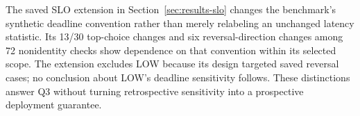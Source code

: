 The saved SLO extension in Section~\ref{sec:results-slo} changes the
benchmark's synthetic deadline convention rather than merely relabeling
an unchanged latency statistic. Its 13/30 top-choice changes and six
reversal-direction changes among 72 nonidentity checks show dependence on
that convention within its selected scope. The extension excludes LOW
because its design targeted saved reversal cases; no conclusion about
LOW's deadline sensitivity follows. These distinctions answer Q3 without
turning retrospective sensitivity into a prospective deployment guarantee.
